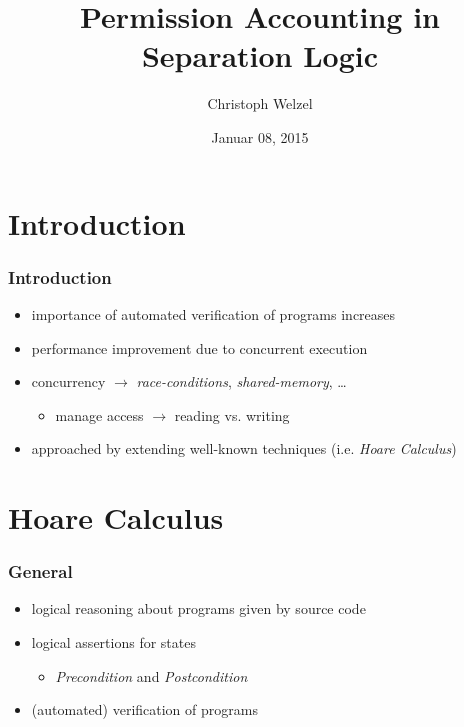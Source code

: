 \documentclass{beamer}
\begin{document}
\author[Christoph Welzel]{Christoph Welzel}
\date{Januar 08, 2015}
\title{Permission Accounting in Separation Logic}
\begin{frame}
	\maketitle
\end{frame}

\begin{frame}
	\tableofcontents
\end{frame}

\section{Introduction}
	\begin{frame}
	\frametitle{Introduction}
	\begin{itemize}
		\item importance of automated verification of programs increases
		\item performance improvement due to concurrent execution
		\item concurrency $\rightarrow$ \emph{race-conditions}, \emph{shared-memory}, \dots
		\begin{itemize}
			\item manage access $\rightarrow$ reading vs. writing
		\end{itemize}
		\item approached by extending well-known techniques (i.e. \emph{Hoare Calculus})
	\end{itemize}
	\end{frame}
\section{Hoare Calculus}
		\begin{frame}
			\frametitle{General}
			\begin{itemize}
				\item logical reasoning about programs given by source code
				\item logical assertions for states
					\begin{itemize}
						\item \emph{Precondition} and \emph{Postcondition}
					\end{itemize}
				\item (automated) verification of programs
			\end{itemize}
		\end{frame}
\end{document}
